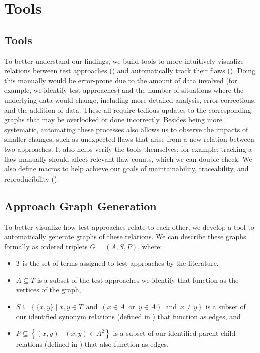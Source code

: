 \ifnotpaper
    \section{Tools}
\else
    \subsection{Tools}
\fi
\label{tools}

\ifnotpaper
    To better understand our findings, we build tools to more intuitively
    visualize relations between test approaches () and
    automatically track their flaws (). Doing
    this manually would be error-prone due to the amount of data involved (for
    example, we identify \approachCount{} test approaches) and the number of
    situations where the underlying data would change, including more detailed
    analysis, error corrections, and the addition of data. These all require
    tedious updates to the corresponding graphs that may be overlooked or done
    incorrectly. Besides being more systematic, automating these processes also
    allows us to observe the impacts of smaller changes, such as unexpected
    flaws that arise from a new relation between two approaches. It
    also helps verify the tools themselves; for example, tracking a flaw
    manually should affect relevant flaw counts, which we can double-check.
    We also define macros to help achieve our goals of
    maintainability, traceability, and reproducibility ().

    \subsection{Approach Graph Generation}
    \label{graph-gen}
\fi

To better visualize how test approaches relate to each other, we
develop a tool to automatically generate graphs of these relations.
\ifnotpaper We can describe these graphs formally as ordered triplets
    $G = (A, S, P)$, where:  %
    \begin{itemize}
        \item $T$ is the set of terms assigned to test approaches by the
              literature,
        \item $A \subseteq T$ is a subset of the \approachCount{} test
              approaches we identify that function as the vertices of the graph,
        \item $S \subseteq \left\{ \{x, y\} \mid x, y \in T \,\textrm{ and }\,
                  (x \in A \,\textrm{ or }\, y \in A) \,\textrm{ and }\, x \neq y \right\}$
              is a subset of our identified synonym relations (defined
              in ) that function as edges, and
        \item $P \subseteq \left\{(x,y) \mid (x, y) \in A^2 \right\}$ is a
              subset of our identified parent-child relations (defined in
              ) that also function as edges.
    \end{itemize}

